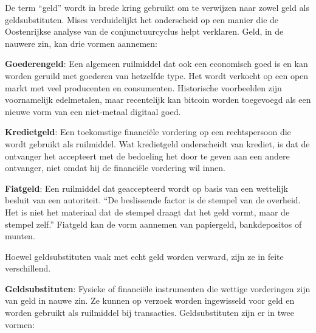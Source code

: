 De term ``geld'' wordt in brede kring gebruikt om te verwijzen naar zowel geld als geldsubstituten. Mises verduidelijkt het onderscheid op een manier die de Oostenrijkse analyse van de conjunctuurcyclus helpt verklaren. Geld, in de nauwere zin, kan drie vormen aannemen:

\vspace{1em}\noindent\textbf{Goederengeld}: Een algemeen ruilmiddel dat ook een economisch goed is en kan worden geruild met goederen van hetzelfde type. Het wordt verkocht op een open markt met veel producenten en consumenten. Historische voorbeelden zijn voornamelijk edelmetalen, maar recentelijk kan bitcoin worden toegevoegd als een nieuwe vorm van een niet-metaal digitaal goed.

\vspace{1em}\noindent\textbf{Kredietgeld}: Een toekomstige financiële vordering op een rechtspersoon die wordt gebruikt als ruilmiddel. Wat kredietgeld onderscheidt van krediet, is dat de ontvanger het accepteert met de bedoeling het door te geven aan een andere ontvanger, niet omdat hij de financiële vordering wil innen.

\vspace{1em}\noindent\textbf{Fiatgeld}: Een ruilmiddel dat geaccepteerd wordt op basis van een wettelijk besluit van een autoriteit. ``De beslissende factor is de stempel van de overheid. Het is niet het materiaal dat de stempel draagt dat het geld vormt, maar de stempel zelf.''\autocite{171} Fiatgeld kan de vorm aannemen van papiergeld, bankdeposito\textquotesingle s of munten.

\vspace{1em}\noindent Hoewel geldsubstituten vaak met echt geld worden verward, zijn ze in feite verschillend.

\vspace{1em}\noindent\textbf{Geldsubstituten}: Fysieke of financiële instrumenten die wettige vorderingen zijn van geld in nauwe zin. Ze kunnen op verzoek worden ingewisseld voor geld en worden gebruikt als ruilmiddel bij transacties. Geldsubstituten zijn er in twee vormen:

